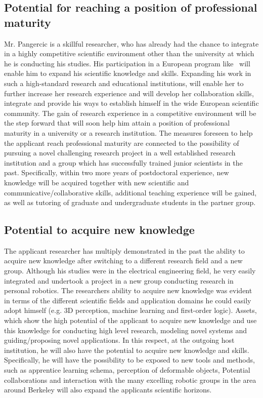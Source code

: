 \subsection{Potential for reaching a position of professional maturity}
Mr. Pangercic is a skillful researcher, who has already had the chance to integrate in a highly 
competitive scientific environment other than the university at which he is conducting his
studies.  His participation in a European program like \ksem\ will enable him to expand 
his scientific knowledge and skills. Expanding his work in such a high-standard research 
and educational institutions, will enable her to further increase her 
research experience and will develop her collaboration skills, integrate and  provide his 
ways to establish himself in the wide European scientific community. The gain of research 
experience in a competitive environment will be the step forward that will soon help him
attain a position of professional maturity in a university or a research institution. The 
measures foreseen to help the applicant reach professional maturity are connected to the 
possibility of pursuing a novel challenging research project in a well established research 
institution and a group which has successfully trained junior scientists in the past. 
Specifically, within two more years of postdoctoral experience, new knowledge will be 
acquired together with new scientific and communicative/collaborative skills, additional 
teaching experience will be gained, as well as tutoring of graduate and undergraduate 
students in the partner group. \\
\subsection{Potential to acquire new knowledge}
The applicant researcher has multiply demonstrated in the past the ability to acquire new 
knowledge after switching to a different research field and a new group. Although his
studies were in the electrical engineering field, he very 
easily integrated and undertook a project in a new group conducting  research in personal
robotics. The researchers ability to acquire new knowledge was evident in terms of 
the different scientific fields and application domains he could easily adopt himself (e.g. 3D perception, machine
learning and first-order logic). Assets, which show the high potential of the applicant to acquire new 
knowledge and use this knowledge for conducting high level research, modeling novel 
systems and guiding/proposing novel applications. In this respect, at the 
outgoing host institution, he will also have the potential to acquire new knowledge and skills. 
Specifically, he will have the possibility to be exposed to new tools and methods, such as 
apprentice learning schema, perception of deformable objects, 
Potential collaborations and interaction with the many excelling 
robotic groups in the area around Berkeley will also 
expand the applicants scientific horizons. 

\newpage
